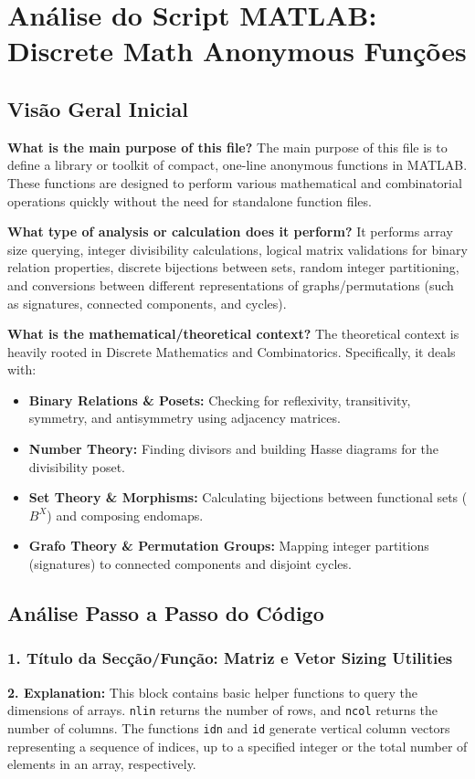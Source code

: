 
\chapter{Análise do Script MATLAB: Discrete Math Anonymous Funções}
\section{Visão Geral Inicial}

\textbf{What is the main purpose of this file?}
The main purpose of this file is to define a library or toolkit of compact, one-line anonymous functions in MATLAB. These functions are designed to perform various mathematical and combinatorial operations quickly without the need for standalone function files.

\textbf{What type of analysis or calculation does it perform?}
It performs array size querying, integer divisibility calculations, logical matrix validations for binary relation properties, discrete bijections between sets, random integer partitioning, and conversions between different representations of graphs/permutations (such as signatures, connected components, and cycles).

\textbf{What is the mathematical/theoretical context?}
The theoretical context is heavily rooted in Discrete Mathematics and Combinatorics. Specifically, it deals with:
\begin{itemize}
    \item \textbf{Binary Relations \& Posets:} Checking for reflexivity, transitivity, symmetry, and antisymmetry using adjacency matrices.
    \item \textbf{Number Theory:} Finding divisors and building Hasse diagrams for the divisibility poset.
    \item \textbf{Set Theory \& Morphisms:} Calculating bijections between functional sets ($B^X$) and composing endomaps.
    \item \textbf{Grafo Theory \& Permutation Groups:} Mapping integer partitions (signatures) to connected components and disjoint cycles.
\end{itemize}

\section{Análise Passo a Passo do Código}

\subsection{1. Título da Secção/Função: Matriz e Vetor Sizing Utilities}
\textbf{2. Explanation:} This block contains basic helper functions to query the dimensions of arrays. \texttt{nlin} returns the number of rows, and \texttt{ncol} returns the number of columns. The functions \texttt{idn} and \texttt{id} generate vertical column vectors representing a sequence of indices, up to a specified integer or the total number of elements in an array, respectively.

